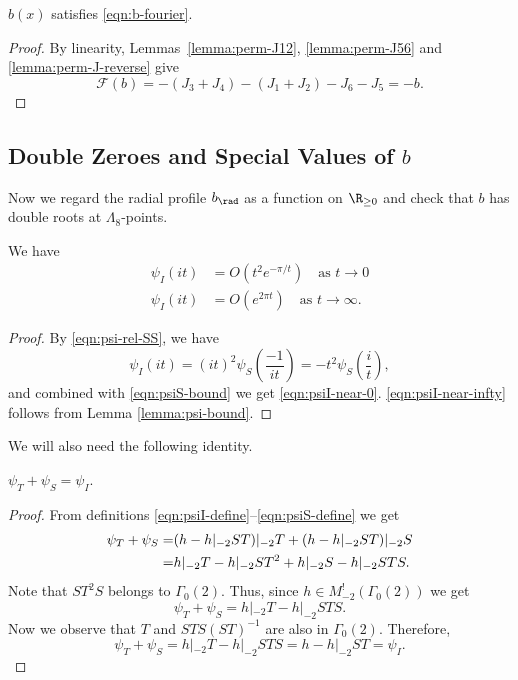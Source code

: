 \begin{proposition}\label{prop:b-fourier}\leanok
$b(x)$ satisfies \eqref{eqn:b-fourier}.
\end{proposition}
\begin{proof}\leanok
By linearity, Lemmas~\ref{lemma:perm-J12}, \ref{lemma:perm-J56} and \ref{lemma:perm-J-reverse} give
\[
    \mathcal{F}(b) = -(J_3 + J_4) - (J_1 + J_2) - J_6 - J_5 = -b.
\]
\end{proof}

\subsection{Double Zeroes and Special Values of $b$}

Now we regard the radial profile $b_\rad$ as a function on $\R_{\geq0}$ and check that $b$ has double roots at $\Lambda_8$-points.

\begin{corollary}\label{cor:psiI-near-0-infty}\leanok
We have
\begin{align}
    \psi_I(it) &= O(t^2 e^{-\pi/t}) \quad \text{as } t \to 0 \label{eqn:psiI-near-0} \\
    \psi_I(it) &= O(e^{2 \pi t}) \quad \text{as } t \to \infty. \label{eqn:psiI-near-infty}
\end{align}
\end{corollary}
\begin{proof}
By \eqref{eqn:psi-rel-SS}, we have
\begin{equation}
    \psi_I(it) = (it)^{2} \psi_S\left(\frac{-1}{it}\right) = -t^{2} \psi_S\left(\frac{i}{t}\right),
\end{equation}
and combined with \eqref{eqn:psiS-bound} we get \eqref{eqn:psiI-near-0}.
\eqref{eqn:psiI-near-infty} follows from Lemma \ref{lemma:psi-bound}.
\end{proof}

We will also need the following identity.

\begin{lemma}\label{lemma:psi-sum}
$\psi_T+\psi_S=\psi_I$.
\end{lemma}
\begin{proof}
From definitions \eqref{eqn:psiI-define}--\eqref{eqn:psiS-define} we get
\begin{align}\psi_T+\psi_S=&(h-h|_{-2}ST)|_{-2}T+(h-h|_{-2}ST)|_{-2}S\notag\\
=&h|_{-2}T-h|_{-2}ST^2+h|_{-2}S-h|_{-2}STS.\notag\end{align}
Note that $ST^2S$ belongs to $\Gamma_0(2)$. Thus, since $h\in M^!_{-2}(\Gamma_0(2))$ we get
$$\psi_T+\psi_S=h|_{-2}T-h|_{-2}STS. $$
Now we observe that $T$ and $STS(ST)^{-1}$ are also in $\Gamma_0(2)$. Therefore,
$$\psi_T+\psi_S=h|_{-2}T-h|_{-2}STS=h-h|_{-2}ST=\psi_I.$$
\end{proof}

